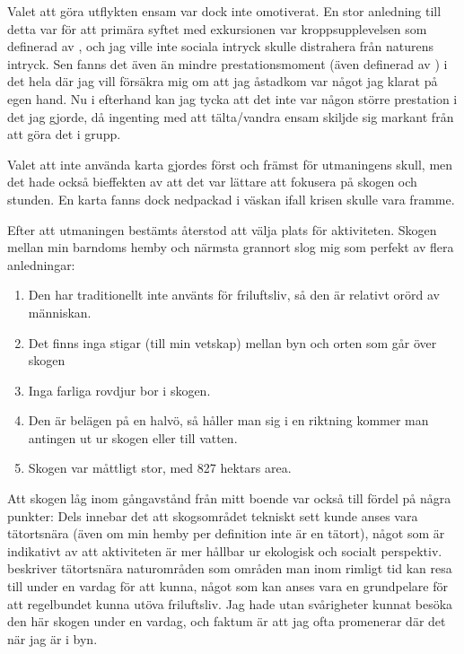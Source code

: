 \documentclass[12pt]{article}   %
\begin{document}
Valet att göra utflykten ensam var dock inte omotiverat. En stor anledning till detta
var för att primära syftet med exkursionen var kroppsupplevelsen som definerad av \cite{sandell2011friluftssport}, och jag ville
inte sociala intryck skulle distrahera från naturens intryck. Sen fanns det även
än mindre prestationsmoment (även definerad av \cite{sandell2011friluftssport})
i det hela där jag vill försäkra mig om att jag åstadkom var något jag klarat
på egen hand. Nu i efterhand kan jag tycka att det inte var någon större prestation
i det jag gjorde, då ingenting med att tälta/vandra ensam skiljde sig markant från
att göra det i grupp.

Valet att inte använda karta gjordes först och främst för utmaningens skull, men det
hade också bieffekten av att det var lättare att fokusera på skogen och stunden\cite{loynes2020}.
En karta fanns dock nedpackad i väskan ifall krisen skulle vara framme.

Efter att utmaningen bestämts återstod att välja plats för aktiviteten. Skogen mellan
min barndoms hemby och närmsta grannort slog mig som perfekt av flera anledningar:

\begin{enumerate}
        \item Den har traditionellt inte använts för friluftsliv, så den är relativt orörd av människan.
        \item Det finns inga stigar (till min vetskap) mellan byn och orten som går över skogen\footnotemark{}
        \item Inga farliga rovdjur bor i skogen.\footnotemark{}
        \item Den är belägen på en halvö, så håller man sig i en riktning kommer man antingen ut ur skogen eller till vatten.
        \item Skogen var måttligt stor, med 827 hektars area.
\end{enumerate}

Att skogen låg inom gångavstånd från mitt boende var också till fördel på några punkter:
Dels innebar det att skogsområdet tekniskt sett kunde anses vara tätortsnära (även om min hemby per definition
inte är en tätort), något som är indikativt av att aktiviteten är mer hållbar ur ekologisk och socialt perspektiv.
\cite{fredman2013friluftsliv} beskriver tätortsnära naturområden som områden man inom rimligt
tid kan resa till under en vardag för att kunna, något som kan anses vara en grundpelare för att
regelbundet kunna utöva friluftsliv. Jag hade utan svårigheter kunnat
besöka den här skogen under en vardag, och faktum är att jag ofta promenerar där det när jag är i byn.
\end{document}
